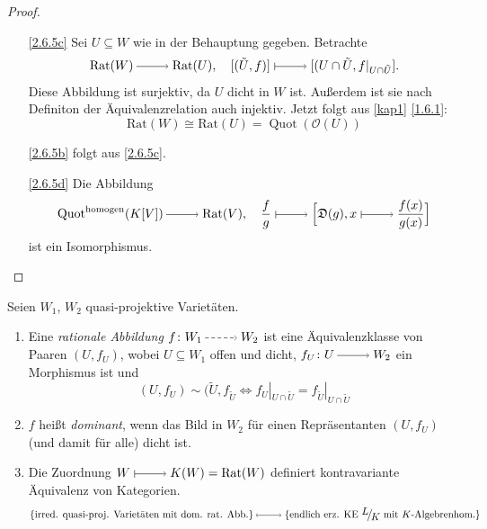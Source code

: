 \documentclass[a4paper,12pt]{scrbook}
\theoremstyle{keinenummern} %
\theoremstyle{mitnummern}
\theoremstyle{unserbeweis}
\newtheorem{proof}{Beweis}
\def\O{\mathcal{O}}
\newcommand{\D}{\mathfrak{D}}
\newcommand{\Rat}{\mathrm{Rat}}
\newcommand{\Quot}{\operatorname{Quot}}
\newcommand{\restrict}[1]{|_{#1}}
\newcommand{\ra}{\raisebox{-1pt}{\tikz{\draw[thin,shorten >=3pt, ->] (0,0) node{\hspace*{-2pt}} -- node{} (1,0);}}\penalty1000\relax}
\renewcommand{\mapsto}{\raisebox{-1pt}{\tikz{\draw[thin,shorten >=3pt, |->] (0,0) node{\hspace*{0pt}} -- node{} (1,0);}}\penalty1000\relax}
\newcommand{\lra}{\raisebox{-1pt}{\tikz{\draw[thin,shorten >=3pt, <->] (0,0) node{\hspace*{-2pt}} -- node{} (1,0);}}\penalty1000\relax}
\newcommand{\ppf}{\raisebox{-1pt}{\tikz{\draw[densely dashed,thin,shorten >=3pt, ->] (0,0) node{\hspace*{-2pt}} -- node{} (1,0);}}\penalty1000\relax}
\newcommand{\Quotient}[2]{
  \mathchoice
  { %
    \raisebox{0.7ex}{\ensuremath{#1}}
    \ensuremath{\mkern-3mu}\big/\ensuremath{\mkern-3mu}
    \raisebox{-0.6ex}{\ensuremath{#2}}
  }
  { %
    #1/#2
  }
  { %
    #1/#2
  }
  { %
    #1/#2
  }
}
\begin{document}
\begin{proof}
\begin{enumerate} 
  \item[\ref{2.6.5c}]  Sei $U\subseteq W$ wie in der Behauptung gegeben. Betrachte
  \[\Rat(W)\ra \Rat(U), \quad [(\tilde{U},f)]\mapsto [(U\cap \tilde{U},f\restrict{U\cap \tilde{U}}].\]
Diese Abbildung ist surjektiv, da $U$ dicht in $W$ ist. Außerdem ist sie nach Definiton der Äquivalenzrelation auch injektiv. Jetzt folgt aus \cref{kap1} \cref{1.6.1}:
\[\Rat(W)\cong \Rat(U)=\Quot(\O(U))\]
  \item[\ref{2.6.5b}] folgt aus \ref{2.6.5c}.
  \item[\ref{2.6.5d}] Die Abbildung 
\[\Quot^{\mathrm{homogen}}(K[V])\ra \Rat(V), \quad \frac{f}{g} \mapsto \Bigl[\D(g),x\mapsto \frac{f(x)}{g(x)}\Bigr]\]
ist ein Isomorphismus.
\end{enumerate}
\end{proof}
\begin{db}\label{2.6.6} Seien $W_1$, $W_2$ quasi-projektive Varietäten.
  \begin{enumerate}
  \item{} Eine \emph{rationale Abbildung} $f\colon W_1\ppf W_2$ ist eine Äquivalenzklasse von Paaren $(U,f_U)$, wobei $U\subseteq W_1$ offen und dicht, $f_U\colon U\ra W_2$ ein Morphismus ist und
   \[(U,f_U)\sim (\tilde{U},f_{\tilde{U}} \iff f_U\restrict{U\cap \tilde{U}}=f_{\tilde U}\restrict{U\cap \tilde{U}}\]
  \item{} $f$ heißt \emph{dominant}, wenn das Bild in $W_2$ für einen Repräsentanten $(U,f_U)$ (und damit für alle) dicht ist. 
  \item{} Die Zuordnung $W\mapsto K(W)=\Rat(W)$  definiert kontravariante Äquivalenz von Kategorien.
    \[\{\text{irred. quasi-proj. Varietäten mit dom. rat. Abb.}\} \lra \{\text{endlich erz. KE } \Quotient{L}{K} \text{ mit } K\text{-Algebrenhom.}\}\] 
  \end{enumerate}
\end{db}
\end{document}
